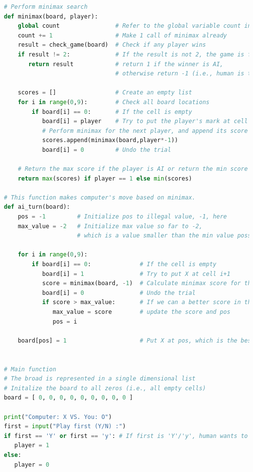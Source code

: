 \documentclass{book}
\begin{document}
\newpage
\begin{lstlisting}[language=Python, basicstyle=\ttfamily\small, keywordstyle=\color{blue}, commentstyle=\color{forestgreen}, stringstyle=\color{red}, showstringspaces=false]
# Perform minimax search
def minimax(board, player):
    global count                # Refer to the global variable count in main
    count += 1                  # Make 1 call of minimax already
    result = check_game(board)  # Check if any player wins
    if result != 2:             # If the result is not 2, the game is finished,
       return result            # return 1 if the winner is AI,
                                # otherwise return -1 (i.e., human is the winner)

    scores = []                 # Create an empty list
    for i in range(0,9):        # Check all board locations
        if board[i] == 0:       # If the cell is empty
           board[i] = player    # Try to put the player's mark at cell i+1
           # Perform minimax for the next player, and append its score to the list
           scores.append(minimax(board,player*-1))
           board[i] = 0         # Undo the trial

    # Return the max score if the player is AI or return the min score if the player is human
    return max(scores) if player == 1 else min(scores)

# This function makes computer's move based on minimax.
def ai_turn(board):
    pos = -1         # Initialize pos to illegal value, -1, here
    max_value = -2   # Initialize max value so far to -2,
                     # which is a value smaller than the min value possible

    for i in range(0,9):
        if board[i] == 0:              # If the cell is empty
           board[i] = 1                # Try to put X at cell i+1
           score = minimax(board, -1)  # Calculate minimax score for the human player
           board[i] = 0                # Undo the trial
           if score > max_value:       # If we can a better score in the next level,
              max_value = score        # update the score and pos
              pos = i

    board[pos] = 1                     # Put X at pos, which is the best move


# Main function
# The broad is represented in a single dimensional list
# Initalize the board to all zeros (i.e., all empty cells)
board = [ 0, 0, 0, 0, 0, 0, 0, 0, 0 ]

print("Computer: X VS. You: O")
first = input("Play first (Y/N) :")
if first == 'Y' or first == 'y': # If first is 'Y'/'y', human wants to play first
   player = 1
else:
   player = 0


\end{lstlisting}
\end{document}
